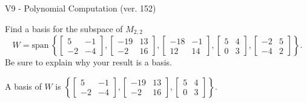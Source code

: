 \begin{exercise}
  \begin{exerciseTitle}V9 - Polynomial Computation (ver. 152)\end{exerciseTitle}
  \begin{exerciseStatement}
    Find a basis for the subspace of \(M_{2,2}\) 
\[W=\mathrm{span}\ \left\{\left[\begin{array}{cc}
5 & -1 \\
-2 & -4
\end{array}\right] , \left[\begin{array}{cc}
-19 & 13 \\
-2 & 16
\end{array}\right] , \left[\begin{array}{cc}
-18 & -1 \\
12 & 14
\end{array}\right] , \left[\begin{array}{cc}
5 & 4 \\
0 & 3
\end{array}\right] , \left[\begin{array}{cc}
-2 & 5 \\
-4 & 2
\end{array}\right]\right\}.\]
 Be sure to explain why your result is a basis.


  \end{exerciseStatement}
  \begin{exerciseAnswer}
   A basis of \(W\) is  \(\left\{\left[\begin{array}{cc}
5 & -1 \\
-2 & -4
\end{array}\right] , \left[\begin{array}{cc}
-19 & 13 \\
-2 & 16
\end{array}\right] , \left[\begin{array}{cc}
5 & 4 \\
0 & 3
\end{array}\right]\right\}\).
  


  \end{exerciseAnswer}
\end{exercise}